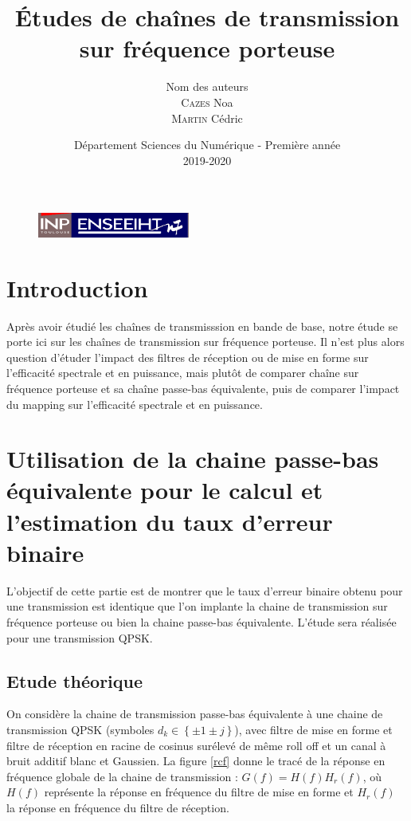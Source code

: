\documentclass[frenchb]{article}
\begin{document}
\begin{figure}[t]
\centering
\includegraphics[width=5cm]{inp_n7.png}
\end{figure}

\title{\vspace{4cm} \textbf{Études de chaînes de transmission sur fréquence porteuse}}
\author{Nom des auteurs\\ \textsc{Cazes} Noa\\ \textsc{Martin} Cédric}
\date{\vspace{11cm} Département Sciences du Numérique - Première année \\
2019-2020 }

\maketitle

\newpage
\tableofcontents
\listoffigures

\newpage


\section{Introduction}

\setlength\parindent{0.5cm}
Après avoir étudié les chaînes de transmisssion en bande de base, notre étude se porte ici sur les chaînes de transmission sur fréquence porteuse. Il n'est plus alors question d'étuder l'impact des filtres de réception ou de mise en forme sur l'efficacité spectrale et en puissance, mais plutôt de comparer chaîne sur fréquence porteuse et sa chaîne passe-bas équivalente, puis de comparer l'impact du mapping sur l'efficacité spectrale et en puissance.  


\section{Utilisation de la chaine passe-bas équivalente pour le calcul et l'estimation du taux d'erreur binaire}

L'objectif de cette partie est de montrer que le taux d'erreur binaire obtenu pour une transmission est identique que l'on implante la chaine de transmission sur fréquence porteuse ou bien la chaine passe-bas équivalente. L'étude sera réalisée pour une transmission QPSK.

\subsection{Etude théorique}
On considère la chaine de transmission passe-bas équivalente à une chaine de transmission QPSK (symboles $d_k \in \left\{\pm 1 \pm j\right\}$), avec filtre de mise en forme et filtre de réception en racine de cosinus surélevé de même roll off et un canal à bruit additif blanc et Gaussien. La figure \ref{rcf} donne le tracé de la réponse en fréquence globale de la chaine de transmission : $G(f)=H(f)H_r(f)$, où $H(f)$ représente la réponse en fréquence du filtre de mise en forme et $H_r(f)$ la réponse en fréquence du filtre de réception.
\end{document}
